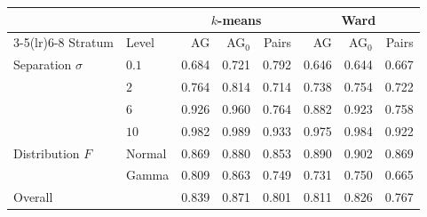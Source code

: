 \begin{tabular}{llrrrrrr}
\toprule
 & & \multicolumn{3}{c}{$k$-means} & \multicolumn{3}{c}{Ward} \\
\cmidrule(lr){3-5}\cmidrule(lr){6-8}
Stratum & Level & AG & AG$_0$ & Pairs & AG & AG$_0$ & Pairs \\
\midrule
Separation $\sigma$ & $0.1$ & 0.684 & 0.721 & 0.792 & 0.646 & 0.644 & 0.667 \\
 & $2$ & 0.764 & 0.814 & 0.714 & 0.738 & 0.754 & 0.722 \\
 & $6$ & 0.926 & 0.960 & 0.764 & 0.882 & 0.923 & 0.758 \\
 & $10$ & 0.982 & 0.989 & 0.933 & 0.975 & 0.984 & 0.922 \\
\addlinespace
Distribution $F$ & Normal & 0.869 & 0.880 & 0.853 & 0.890 & 0.902 & 0.869 \\
 & Gamma & 0.809 & 0.863 & 0.749 & 0.731 & 0.750 & 0.665 \\
\midrule
Overall & & 0.839 & 0.871 & 0.801 & 0.811 & 0.826 & 0.767 \\
\bottomrule
\end{tabular}
